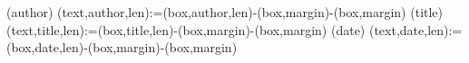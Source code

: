 
%


\makeatletter
\sffamily



\RequirePackage{anysize}

(author){%
  \spine(text,author,len):={\dimexpr\thespine(box,author,len)-\thespine(box,margin)-\thespine(box,margin)}
}{}
(title){%
  \spine(text,title,len):={\dimexpr\thespine(box,title,len)-\thespine(box,margin)-\thespine(box,margin)}
}{}
(date){%
  \spine(text,date,len):={\dimexpr\thespine(box,date,len)-\thespine(box,margin)-\thespine(box,margin)}
}{}


\newcommand{\@spinetextalin}[1]{%
  \raggedright%
  \IfStrEqCase{\thespine(box,#1,align)}{%
    {l}{\raggedright}%
    {c}{\centering}%
    {r}{\raggedleft}%
  }%
}

\newcommand{\@spinetextcolor}[1]{%
  \ifdatadefined{spine}(box,#1,textcolor){%
    \color{\thespine(box,#1,textcolor)}%
  }{\ifdatadefined{spine}(text,color){%
    \color{\thespine(text,color)}%
  }{}%
  }%
}


